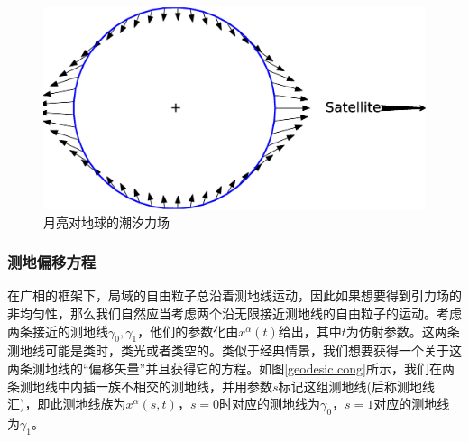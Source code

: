 \documentclass[hyperref, UTF8, a4paper]{ctexart}
\begin{document}
\begin{figure}[h]
	\centering
	\includegraphics[scale=0.3]{tidal_of_moon.eps}
	\caption{月亮对地球的潮汐力场}
	\label{tidal_of_moon}
\end{figure}
\subsubsection{测地偏移方程}
在广相的框架下，局域的自由粒子总沿着测地线运动，因此如果想要得到引力场的非均匀性，那么我们自然应当考虑两个沿无限接近测地线的自由粒子的运动。考虑两条接近的测地线$\gamma _{0} ,\gamma _{1}$，他们的参数化由$x^{\alpha }( t)$给出，其中$t$为仿射参数。这两条测地线可能是类时，类光或者类空的。类似于经典情景，我们想要获得一个关于这两条测地线的“偏移矢量”并且获得它的方程。如图\ref{geodesic cong}所示，我们在两条测地线中内插一族不相交的测地线，并用参数$s$标记这组测地线(后称测地线汇)，即此测地线族为$x^{\alpha }( s,t)$，$s=0$时对应的测地线为$\gamma _{0}$，$s=1$对应的测地线为$\gamma _{1}$。
\end{document}
